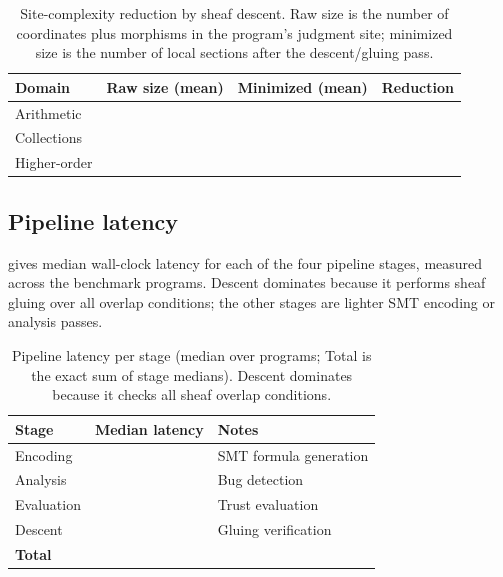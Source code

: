 \documentclass[11pt]{article}
\begin{document}
\begin{table}[ht]
\centering
\begin{tabular}{lrrr}
\toprule
\textbf{Domain} & \textbf{Raw size (mean)} & \textbf{Minimized (mean)} & \textbf{Reduction} \\
\midrule
  Arithmetic    & \ppTwentyArithRawSize{}  & \ppTwentyArithMinSize{}  & \ppTwentyArithReduction{} \\
  Collections   & \ppTwentyCollRawSize{}   & \ppTwentyCollMinSize{}   & \ppTwentyCollReduction{}  \\
  Higher-order  & \ppTwentyHORawSize{}     & \ppTwentyHOMinSize{}     & \ppTwentyHOReduction{}    \\
\bottomrule
\end{tabular}
\caption{Site-complexity reduction by sheaf descent.
         Raw size is the number of coordinates plus morphisms in the
         program's judgment site; minimized size is the number of local
         sections after the descent/gluing pass.}
\label{tab:size}
\end{table}

\subsection{Pipeline latency}

 gives median wall-clock latency for each of the four
pipeline stages, measured across the \ppTwentyTotalPrograms{} benchmark
programs.  Descent dominates because it performs sheaf gluing over all
overlap conditions; the other stages are lighter SMT encoding or
analysis passes.

\begin{table}[ht]
\centering
\begin{tabular}{lrl}
\toprule
\textbf{Stage} & \textbf{Median latency} & \textbf{Notes} \\
\midrule
  Encoding      & \ppTwentyEncodeTime{}   & SMT formula generation \\
  Analysis      & \ppTwentyBugsTime{}     & Bug detection \\
  Evaluation    & \ppTwentyEvalTime{}     & Trust evaluation \\
  Descent       & \ppTwentyDescendTime{}  & Gluing verification \\
\midrule
  \textbf{Total} & \ppTwentyTotalTime{} & \\
\bottomrule
\end{tabular}
\caption{Pipeline latency per stage (median over \ppTwentyTotalPrograms{}
         programs; Total is the exact sum of stage medians).  Descent
         dominates because it checks all sheaf overlap conditions.}
\label{tab:latency}
\end{table}
\end{document}
